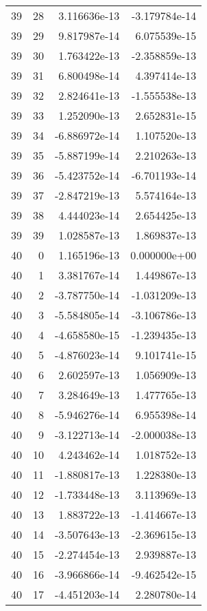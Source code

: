 \begin{tabular}{rrrr}
  39 &   28 &  3.116636e-13 & -3.179784e-14 \\
  39 &   29 &  9.817987e-14 &  6.075539e-15 \\
  39 &   30 &  1.763422e-13 & -2.358859e-13 \\
  39 &   31 &  6.800498e-14 &  4.397414e-13 \\
  39 &   32 &  2.824641e-13 & -1.555538e-13 \\
  39 &   33 &  1.252090e-13 &  2.652831e-15 \\
  39 &   34 & -6.886972e-14 &  1.107520e-13 \\
  39 &   35 & -5.887199e-14 &  2.210263e-13 \\
  39 &   36 & -5.423752e-14 & -6.701193e-14 \\
  39 &   37 & -2.847219e-13 &  5.574164e-13 \\
  39 &   38 &  4.444023e-14 &  2.654425e-13 \\
  39 &   39 &  1.028587e-13 &  1.869837e-13 \\
  40 &    0 &  1.165196e-13 &  0.000000e+00 \\
  40 &    1 &  3.381767e-14 &  1.449867e-13 \\
  40 &    2 & -3.787750e-14 & -1.031209e-13 \\
  40 &    3 & -5.584805e-14 & -3.106786e-13 \\
  40 &    4 & -4.658580e-15 & -1.239435e-13 \\
  40 &    5 & -4.876023e-14 &  9.101741e-15 \\
  40 &    6 &  2.602597e-13 &  1.056909e-13 \\
  40 &    7 &  3.284649e-13 &  1.477765e-13 \\
  40 &    8 & -5.946276e-14 &  6.955398e-14 \\
  40 &    9 & -3.122713e-14 & -2.000038e-13 \\
  40 &   10 &  4.243462e-14 &  1.018752e-13 \\
  40 &   11 & -1.880817e-13 &  1.228380e-13 \\
  40 &   12 & -1.733448e-13 &  3.113969e-13 \\
  40 &   13 &  1.883722e-13 & -1.414667e-13 \\
  40 &   14 & -3.507643e-13 & -2.369615e-13 \\
  40 &   15 & -2.274454e-13 &  2.939887e-13 \\
  40 &   16 & -3.966866e-14 & -9.462542e-15 \\
  40 &   17 & -4.451203e-14 &  2.280780e-14 \\

\end{tabular}
